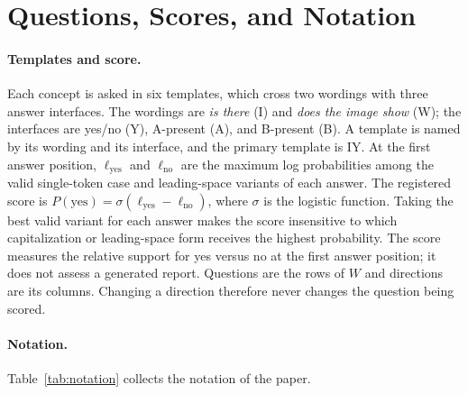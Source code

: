 \section{Questions, Scores, and Notation}
\label{app:protocol}

\paragraph{Templates and score.} Each concept is asked in six templates, which cross two wordings with three answer interfaces. The wordings are \emph{is there} (I) and \emph{does the image show} (W); the interfaces are yes/no (Y), A-present (A), and B-present (B). A template is named by its wording and its interface, and the primary template is IY. At the first answer position, $\ell_{\mathrm{yes}}$ and $\ell_{\mathrm{no}}$ are the maximum log probabilities among the valid single-token case and leading-space variants of each answer. The registered score is $P(\mathrm{yes})=\sigma(\ell_{\mathrm{yes}}-\ell_{\mathrm{no}})$, where $\sigma$ is the logistic function. Taking the best valid variant for each answer makes the score insensitive to which capitalization or leading-space form receives the highest probability. The score measures the relative support for yes versus no at the first answer position; it does not assess a generated report. Questions are the rows of $W$ and directions are its columns. Changing a direction therefore never changes the question being scored.

\paragraph{Notation.} Table~\ref{tab:notation} collects the notation of the paper.

